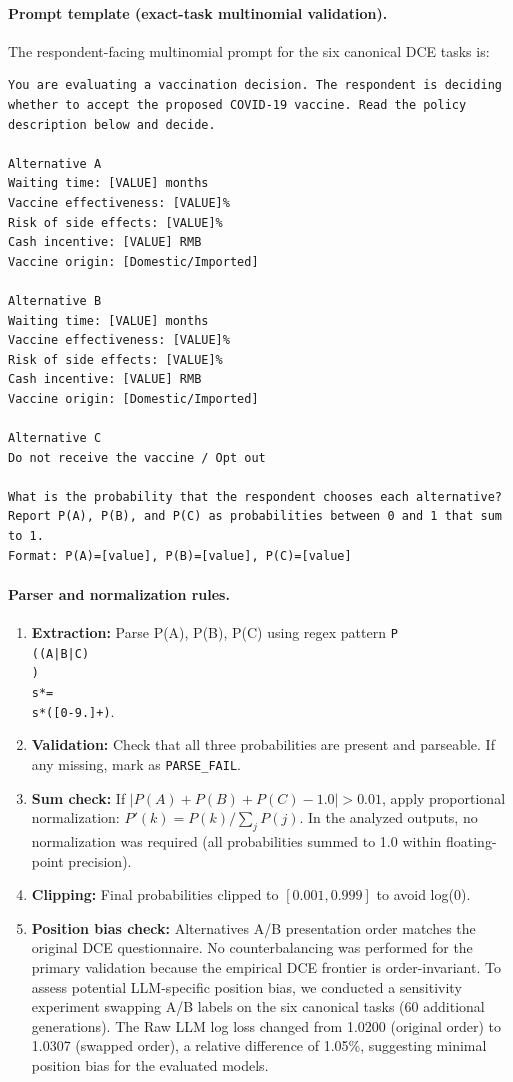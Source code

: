 \documentclass[11pt]{article}
\begin{document}
\paragraph{Prompt template (exact-task multinomial validation).}
The respondent-facing multinomial prompt for the six canonical DCE tasks is:

\begin{verbatim}
You are evaluating a vaccination decision. The respondent is deciding 
whether to accept the proposed COVID-19 vaccine. Read the policy 
description below and decide.

Alternative A
Waiting time: [VALUE] months
Vaccine effectiveness: [VALUE]%
Risk of side effects: [VALUE]%
Cash incentive: [VALUE] RMB
Vaccine origin: [Domestic/Imported]

Alternative B
Waiting time: [VALUE] months
Vaccine effectiveness: [VALUE]%
Risk of side effects: [VALUE]%
Cash incentive: [VALUE] RMB
Vaccine origin: [Domestic/Imported]

Alternative C
Do not receive the vaccine / Opt out

What is the probability that the respondent chooses each alternative?
Report P(A), P(B), and P(C) as probabilities between 0 and 1 that sum to 1.
Format: P(A)=[value], P(B)=[value], P(C)=[value]
\end{verbatim}

\paragraph{Parser and normalization rules.}
\begin{enumerate}
    \item \textbf{Extraction:} Parse P(A), P(B), P(C) using regex pattern \texttt{P\\((A|B|C)\\)\\s*=\\s*([0-9.]+)}.
    \item \textbf{Validation:} Check that all three probabilities are present and parseable. If any missing, mark as \texttt{PARSE\_FAIL}.
    \item \textbf{Sum check:} If $|P(A)+P(B)+P(C) - 1.0| > 0.01$, apply proportional normalization: $P'(k) = P(k) / \sum_j P(j)$. In the analyzed outputs, no normalization was required (all probabilities summed to 1.0 within floating-point precision).
    \item \textbf{Clipping:} Final probabilities clipped to $[0.001, 0.999]$ to avoid log(0).
    \item \textbf{Position bias check:} Alternatives A/B presentation order matches the original DCE questionnaire. No counterbalancing was performed for the primary validation because the empirical DCE frontier is order-invariant. To assess potential LLM-specific position bias, we conducted a sensitivity experiment swapping A/B labels on the six canonical tasks (60 additional generations). The Raw LLM log loss changed from 1.0200 (original order) to 1.0307 (swapped order), a relative difference of 1.05\%, suggesting minimal position bias for the evaluated models.
\end{enumerate}
\end{document}
